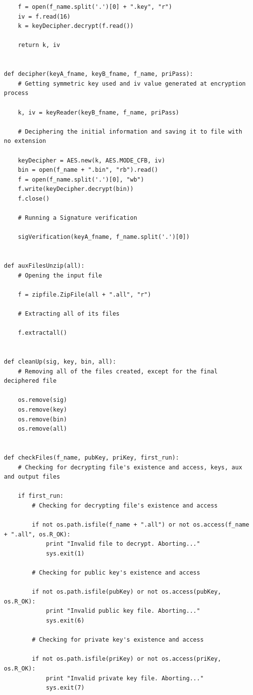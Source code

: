 \documentclass[a4paper,11pt,openright,oneside]{report}
\begin{document}
\begin{appendices}
\begin{verbatim}
    f = open(f_name.split('.')[0] + ".key", "r")
    iv = f.read(16)
    k = keyDecipher.decrypt(f.read())

    return k, iv


def decipher(keyA_fname, keyB_fname, f_name, priPass):
    # Getting symmetric key used and iv value generated at encryption process

    k, iv = keyReader(keyB_fname, f_name, priPass)

    # Deciphering the initial information and saving it to file with no extension

    keyDecipher = AES.new(k, AES.MODE_CFB, iv)
    bin = open(f_name + ".bin", "rb").read()
    f = open(f_name.split('.')[0], "wb")
    f.write(keyDecipher.decrypt(bin))
    f.close()

    # Running a Signature verification

    sigVerification(keyA_fname, f_name.split('.')[0])


def auxFilesUnzip(all):
    # Opening the input file

    f = zipfile.ZipFile(all + ".all", "r")

    # Extracting all of its files

    f.extractall()


def cleanUp(sig, key, bin, all):
    # Removing all of the files created, except for the final deciphered file

    os.remove(sig)
    os.remove(key)
    os.remove(bin)
    os.remove(all)


def checkFiles(f_name, pubKey, priKey, first_run):
    # Checking for decrypting file's existence and access, keys, aux and output files

    if first_run:
        # Checking for decrypting file's existence and access

        if not os.path.isfile(f_name + ".all") or not os.access(f_name + ".all", os.R_OK):
            print "Invalid file to decrypt. Aborting..."
            sys.exit(1)

        # Checking for public key's existence and access

        if not os.path.isfile(pubKey) or not os.access(pubKey, os.R_OK):
            print "Invalid public key file. Aborting..."
            sys.exit(6)

        # Checking for private key's existence and access

        if not os.path.isfile(priKey) or not os.access(priKey, os.R_OK):
            print "Invalid private key file. Aborting..."
            sys.exit(7)


\end{verbatim}
\end{appendices}
\end{document}

